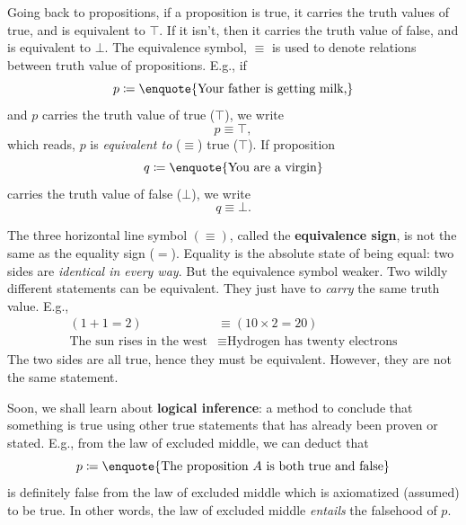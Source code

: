 Going back to propositions, if a proposition is true, it carries the truth values of true, and is equivalent to \(\top\). If it isn't, then it carries the truth value of false, and is equivalent to \(\bot\). The equivalence symbol, \(\equiv\) is used to denote relations between truth value of propositions. E.g., if
\begin{equation}
  p \coloneqq \textrm{\enquote{Your father is getting milk,}}
\end{equation}
and \(p\) carries the truth value of true (\(\top\)), we write
\begin{equation}
  p \equiv \top,
\end{equation}
which reads, $p$ is \emph{equivalent to} (\(\equiv\)) true (\(\top\)). If proposition
\begin{equation}
  q \coloneqq \textrm{\enquote{You are a virgin}}
\end{equation}
carries the truth value of false (\(\bot\)), we write
\begin{equation}
  q \equiv \bot.
\end{equation}

The three horizontal line symbol \((\equiv)\), called the \textbf{equivalence sign}, is not the same as the equality sign (\(=\)). Equality is the absolute state of being equal: two sides are \emph{identical in every way}. But the equivalence symbol weaker. Two wildly different statements can be equivalent. They just have to \emph{carry} the same truth value. E.g.,
\begin{align}
  (1 + 1 = 2)                        & \equiv (10 \times 2 = 20)                     \\
  \textrm{The sun rises in the west} & \equiv \textrm{Hydrogen has twenty electrons}
\end{align}
The two sides are all true, hence they must be equivalent. However, they are not the same statement.

Soon, we shall learn about \textbf{logical inference}: a method to conclude that something is true using other true statements that has already been proven or stated. E.g., from the law of excluded middle, we can deduct that
\begin{equation}
  p \coloneqq \textrm{\enquote{The proposition \(A\) is both true and false}}
\end{equation}
is definitely false from the law of excluded middle which is axiomatized (assumed) to be true. In other words, the law of excluded middle \emph{entails} the falsehood of \(p\).

